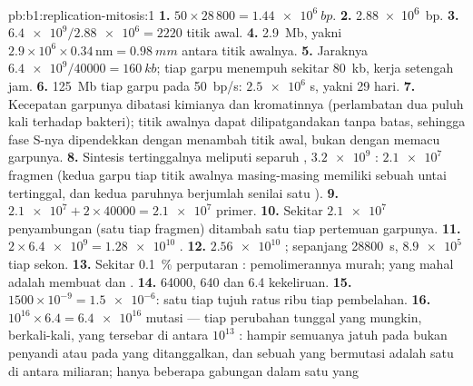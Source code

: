 \begin{solution}{pb:b1:replication-mitosis:1}
\textbf{1.} $50\times 28\,800 = \qty{1.44e6}{bp}$.
\textbf{2.} \qty{2.88e6}{bp}.
\textbf{3.} $\num{6.4e9}/\num{2.88e6} = 2220$ titik awal.
\textbf{4.} \qty{2.9}{Mb}, yakni $2.9\times 10^6\times 0.34\,\mathrm{nm} =
\qty{0.98}{mm}$  antara titik awalnya.
\textbf{5.} Jaraknya $\num{6.4e9}/\num{40000} = \qty{160}{kb}$; tiap
garpu menempuh sekitar \qty{80}{kb}, kerja setengah jam.
\textbf{6.} \qty{125}{Mb} tiap garpu pada \qty{50}{bp/s}: $\num{2.5e6}$
s, yakni 29 hari.
\textbf{7.} Kecepatan garpunya dibatasi kimianya dan kromatinnya
(perlambatan dua puluh kali terhadap bakteri); titik awalnya dapat
dilipatgandakan tanpa batas, sehingga fase S-nya dipendekkan dengan
menambah titik awal, bukan dengan memacu garpunya.
\textbf{8.} Sintesis tertinggalnya meliputi separuh ,
$\num{3.2e9}$ : $\num{2.1e7}$ fragmen (kedua garpu tiap titik
awalnya masing-masing memiliki sebuah untai tertinggal, dan kedua
paruhnya berjumlah senilai satu ).
\textbf{9.} $\num{2.1e7} + 2\times\num{40000} = \num{2.1e7}$ primer.
\textbf{10.} Sekitar $\num{2.1e7}$ penyambungan (satu tiap fragmen)
ditambah satu tiap pertemuan garpunya.
\textbf{11.} $2\times\num{6.4e9} = \num{1.28e10}$ .
\textbf{12.} $\num{2.56e10}$ ; sepanjang \qty{28800}{s},
$\num{8.9e5}$ tiap sekon.
\textbf{13.} Sekitar \qty{0.1}{\%} perputaran  :
pemolimerannya murah; yang mahal adalah membuat  dan
.
\textbf{14.} \num{64000}, 640 dan 6.4 kekeliruan.
\textbf{15.} $1500\times 10^{-9} = \num{1.5e-6}$: satu  tiap tujuh
ratus ribu tiap pembelahan.
\textbf{16.} $10^{16}\times 6.4 = \num{6.4e16}$ mutasi --- tiap
perubahan tunggal  yang mungkin, berkali-kali, yang tersebar di
antara $10^{13}$ : hampir semuanya jatuh pada  bukan penyandi
atau pada  yang ditanggalkan, dan sebuah  yang bermutasi adalah
satu di antara miliaran; hanya beberapa gabungan dalam satu  yang

\end{solution}

